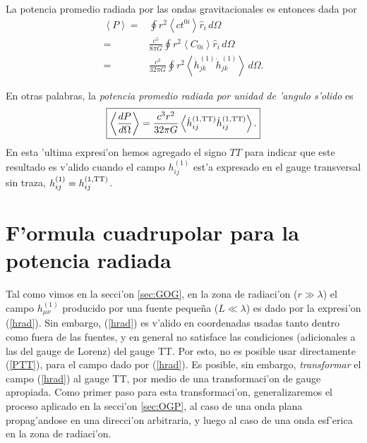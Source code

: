 La potencia promedio radiada por las ondas gravitacionales es entonces dada por
\begin{align}
\left\langle P\right\rangle =& \oint r^2 \left\langle ct^{0i}\right\rangle\hat{r}_i\,d\Omega\\
=& \frac{c^5}{8\pi G}\oint r^2\left\langle C_{0i}\right\rangle\hat{r}_i\,d\Omega\\
=& \frac{c^3}{32\pi G} \oint r^2\left\langle\dot{h}_{jk}^{(1)}\dot{h}_{jk}^{(1)}\right\rangle\,d\Omega .
\end{align}

En otras palabras, la \textit{potencia promedio radiada por unidad de 'angulo s'olido} es
\begin{equation}\label{PTT}
\boxed{\left\langle\frac{d P}{d\Omega}\right\rangle=\frac{c^3r^2}{32\pi G} \left\langle\dot{h}_{ij}^{(1,\rm TT)}\dot{h}_{ij}^{(1,\rm TT)}\right\rangle .}
\end{equation}
En esta 'ultima expresi'on hemos agregado el signo $TT$ para indicar que este resultado es v'alido cuando el campo $h^{(1)}_{ij}$ est'a expresado en el gauge transversal sin traza, $h^{(1)}_{ij}=h^{(1,\rm TT)}_{ij}$.

\section{F'ormula cuadrupolar para la potencia radiada}
Tal como vimos en la secci'on \ref{sec:GOG}, en la zona de radiaci'on ($r\gg\lambda$) el campo $h^{(1)}_{\mu\nu}$ producido por una fuente peque\~na ($L\ll\lambda$) es dado por la expresi'on (\ref{hrad}). Sin embargo, (\ref{hrad}) es v'alido en coordenadas usadas tanto dentro como fuera de las fuentes, y en general no satisface las condiciones (adicionales a las del gauge de Lorenz) del gauge TT. Por esto, no es posible usar directamente (\ref{PTT}), para el campo dado por (\ref{hrad}). Es posible, sin embargo, \textit{transformar} el campo (\ref{hrad}) al gauge TT, por medio de una transformaci'on de gauge apropiada. Como primer paso para esta transformaci'on, generalizaremos el proceso aplicado en la secci'on \ref{sec:OGP}, al caso de una onda plana propag'andose en una direcci'on arbitraria, y luego al caso de una onda esf'erica en la zona de radiaci'on.

